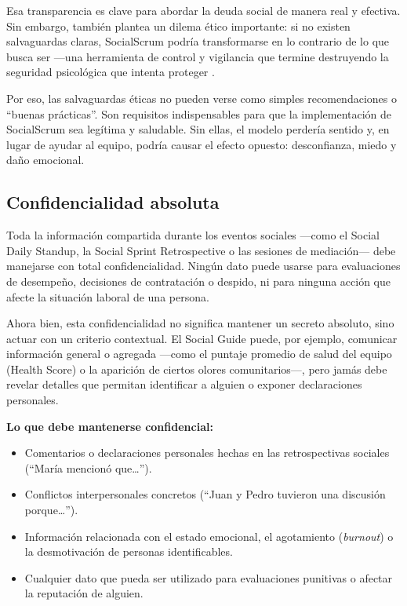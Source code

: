 Esa transparencia es clave para abordar la deuda social de manera real y efectiva. Sin embargo, también plantea un dilema ético importante: si no existen salvaguardas claras, SocialScrum podría transformarse en lo contrario de lo que busca ser —una herramienta de control y vigilancia que termine destruyendo la seguridad psicológica que intenta proteger \cite{mayer_integrative_1995}.

Por eso, las salvaguardas éticas no pueden verse como simples recomendaciones o ``buenas prácticas''. Son requisitos indispensables para que la implementación de SocialScrum sea legítima y saludable. Sin ellas, el modelo perdería sentido y, en lugar de ayudar al equipo, podría causar el efecto opuesto: desconfianza, miedo y daño emocional.

\subsection{Confidencialidad absoluta}

Toda la información compartida durante los eventos sociales —como el Social Daily Standup, la Social Sprint Retrospective o las sesiones de mediación— debe manejarse con total confidencialidad. Ningún dato puede usarse para evaluaciones de desempeño, decisiones de contratación o despido, ni para ninguna acción que afecte la situación laboral de una persona.

Ahora bien, esta confidencialidad no significa mantener un secreto absoluto, sino actuar con un criterio contextual. El Social Guide puede, por ejemplo, comunicar información general o agregada —como el puntaje promedio de salud del equipo (Health Score) o la aparición de ciertos olores comunitarios—, pero jamás debe revelar detalles que permitan identificar a alguien o exponer declaraciones personales.

\textbf{Lo que debe mantenerse confidencial:}
\begin{itemize}
    \item Comentarios o declaraciones personales hechas en las retrospectivas sociales (``María mencionó que…'').
    \item Conflictos interpersonales concretos (``Juan y Pedro tuvieron una discusión porque…'').
    \item Información relacionada con el estado emocional, el agotamiento (\textit{burnout}) o la desmotivación de personas identificables.
    \item Cualquier dato que pueda ser utilizado para evaluaciones punitivas o afectar la reputación de alguien.
\end{itemize}

